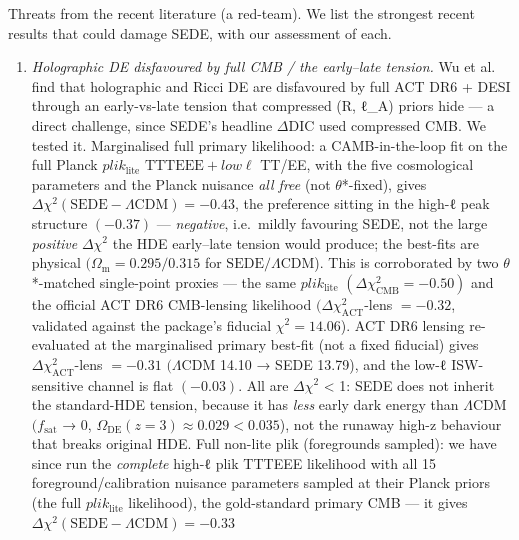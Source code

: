 \documentclass[preprint,12pt]{elsarticle}
\providecommand{\tightlist}{\setlength{\itemsep}{0pt}\setlength{\parskip}{0pt}}
\begin{document}
Threats from the recent literature (a red-team). We list the strongest
recent results that could damage SEDE, with our assessment of each.

\begin{enumerate}
\def\labelenumi{\arabic{enumi}.}
\tightlist
\item
  \emph{Holographic DE disfavoured by full CMB / the early--late
  tension.} Wu et al. \citep{Wu:2025vfs} find that holographic and Ricci
  DE are disfavoured by full ACT DR6 + DESI through an early-vs-late
  tension that compressed (R, ℓ\_A) priors hide --- a direct challenge,
  since SEDE's headline \(\Delta \mathrm{DIC}\) used compressed CMB. We
  tested it. Marginalised full primary likelihood: a CAMB-in-the-loop
  fit on the full Planck \(plik_{\mathrm{lite}}\)
  \(\mathrm{TTTEEE} + low\ell\) TT/EE, with the five cosmological
  parameters and the Planck nuisance \emph{all free} (not
  \(\theta\)*-fixed), gives
  \(\Delta \chi ^{2}(\mathrm{SEDE}-\Lambda \mathrm{CDM}) = -0.43\), the
  preference sitting in the high-ℓ peak structure \((-0.37)\) ---
  \emph{negative}, i.e.~mildly favouring SEDE, not the large
  \emph{positive} \(\Delta \chi ^{2}\) the HDE early--late tension would
  produce; the best-fits are physical
  \((\Omega _{\mathrm{m}} = 0.295/0.315\) for
  \(\mathrm{SEDE}/\Lambda \mathrm{CDM}\)). This is corroborated by two
  \(\theta\)*-matched single-point proxies --- the same
  \(plik_{\mathrm{lite}}\) \((\Delta \chi ^{2}_\mathrm{CMB} = -0.50)\)
  and the official ACT DR6 CMB-lensing likelihood
  \((\Delta \chi ^{2}_\mathrm{ACT}\)-lens \(= -0.32\), validated against
  the package's fiducial \(\chi ^{2} = 14.06\)). ACT DR6 lensing
  re-evaluated at the marginalised primary best-fit (not a fixed
  fiducial) gives \(\Delta \chi ^{2}_\mathrm{ACT}\)-lens \(= -0.31\)
  \((\Lambda \mathrm{CDM}\) 14.10 → SEDE 13.79), and the low-ℓ
  ISW-sensitive channel is flat \((-0.03)\). All are
  \textbar{}\(\Delta \chi ^{2}\)\textbar{} \textless{} 1: SEDE does not
  inherit the standard-HDE tension, because it has \emph{less} early
  dark energy than \(\Lambda \mathrm{CDM}\) \((f_{\mathrm{sat}}\) → 0,
  \(\Omega _\mathrm{DE}(z=3) \approx  0.029 < 0.035\)), not the runaway
  high-z behaviour that breaks original HDE. Full non-lite plik
  (foregrounds sampled): we have since run the \emph{complete} high-ℓ
  plik TTTEEE likelihood with all 15 foreground/calibration nuisance
  parameters sampled at their Planck priors (the full
  \(plik_{\mathrm{lite}}\) likelihood), the gold-standard primary CMB
  --- it gives
  \(\Delta \chi ^{2}(\mathrm{SEDE}-\Lambda \mathrm{CDM}) = -0.33\)

\end{enumerate}
\end{document}
